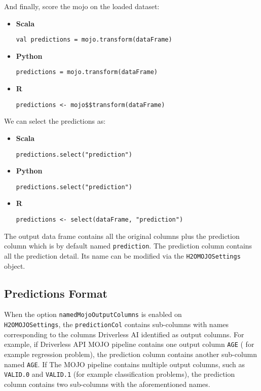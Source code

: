 And finally, score the mojo on the loaded dataset:

\begin{itemize}
    \item \textbf{Scala} \begin{lstlisting}[style=Scala]
val predictions = mojo.transform(dataFrame)
    \end{lstlisting}
    \item \textbf{Python} \begin{lstlisting}[style=Python]
predictions = mojo.transform(dataFrame)
    \end{lstlisting}
    \item \textbf{R} \begin{lstlisting}[style=R]
predictions <- mojo$$transform(dataFrame)
    \end{lstlisting}
\end{itemize}

We can select the predictions as:

\begin{itemize}
    \item \textbf{Scala} \begin{lstlisting}[style=Scala]
predictions.select("prediction")
    \end{lstlisting}
    \item \textbf{Python} \begin{lstlisting}[style=Python]
predictions.select("prediction")
    \end{lstlisting}
    \item \textbf{R} \begin{lstlisting}[style=R]
predictions <- select(dataFrame, "prediction")
    \end{lstlisting}
\end{itemize}


The output data frame contains all the original columns plus the prediction column which is by default named
\texttt{prediction}. The prediction column contains all the prediction detail. Its name can be
modified via the \texttt{H2OMOJOSettings} object.

\subsection{Predictions Format}

When the option \texttt{namedMojoOutputColumns} is enabled on\\ \texttt{H2OMOJOSettings}, the \texttt{predictionCol} contains sub-columns with
names corresponding to the columns Driverless AI identified as output columns. For example, if Driverless API MOJO
pipeline contains one output column \texttt{AGE} ( for example regression problem), the prediction column contains another sub-column
named \texttt{AGE}. If The MOJO pipeline contains multiple output columns, such as \texttt{VALID.0} and \texttt{VALID.1} (for example classification problems),
the prediction column contains two sub-columns with the aforementioned names.

